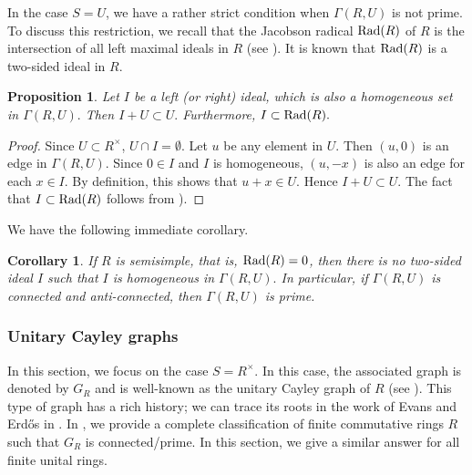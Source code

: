 \documentclass[12pt, a4paper]{amsart}
\newtheorem{prop}[thm]{Proposition}
\newtheorem{cor}[thm]{Corollary}
\theoremstyle{definition}
\numberwithin{equation}{section}
\newcommand{\Rad}{{\rm Rad}}
\begin{document}
In the case $S=U$, we have a rather strict condition when $\Gamma(R,U)$ is not prime. To discuss this restriction,  we recall that the Jacobson radical $\Rad(R)$ of $R$ is the intersection of all left maximal ideals in $R$ (see \cite[Chapter 4.3]{pierce1982associative}). It is known that $\Rad(R)$ is a two-sided ideal in $R$. 

\begin{prop}
    Let $I$ be a left (or right) ideal, which is also a homogeneous set in $\Gamma(R,U).$ Then $I + U \subset U.$ Furthermore, $I \subset \Rad(R).$
\end{prop}

\begin{proof}
    Since $U \subset R^{\times}$, $U \cap I = \emptyset.$  Let $u$ be any element in $U$. Then $(u,0)$ is an edge in $\Gamma(R,U).$ Since $0 \in I$ and $I$ is homogeneous, $(u, -x)$ is also an edge for each $x \in I.$ By definition, this shows that $u+x \in U.$ Hence $I+U\subset U$.
    The fact that $I \subset \Rad(R)$ follows from \cite[Chapter 4.3]{pierce1982associative}). 
\end{proof}
We have the following immediate corollary. 
\begin{cor} \label{cor:prime}
    If $R$ is semisimple, that is, $\Rad(R)=0$, then there is no two-sided ideal $I$ such that $I$ is homogeneous in $\Gamma(R,U).$ In particular, if $\Gamma(R,U)$ is connected and anti-connected, then $\Gamma(R,U)$ is prime. 
\end{cor}
\subsubsection{Unitary Cayley graphs}
In this section, we focus on the case $S=R^{\times}$. In this case, the associated graph is denoted by $G_R$ and is well-known as the unitary Cayley graph of $R$ (see \cite{unitary, chen2022unitary}). This type of graph has a rich history; we can trace its roots in the work of Evans and Erdős in \cite{erdos1989representations}. In \cite{chudnovsky2024prime, minavc2024complete, nguyengcd2026}, we provide a complete classification of finite commutative rings $R$ such that $G_{R}$ is connected/prime. In this section, we give a similar answer for all finite unital rings. 
\end{document}
